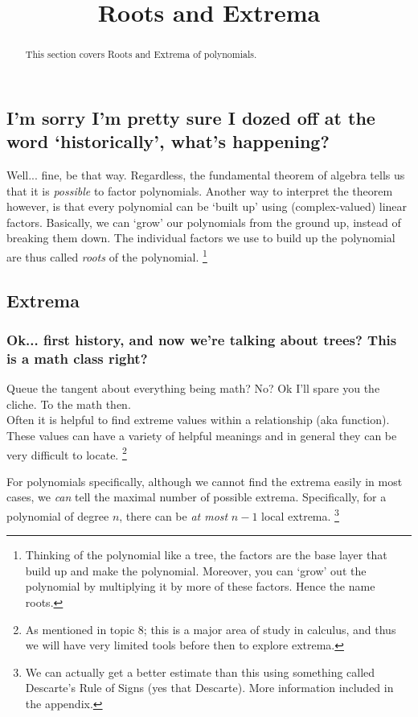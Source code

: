 \documentclass{ximeraXloud}
\title{Roots and Extrema}
\begin{document}
\begin{abstract}
This section covers Roots and Extrema of polynomials.
\end{abstract}
\maketitle

\subsection*{I'm sorry I'm pretty sure I dozed off at the word `historically', what's happening?}

    Well... fine, be that way. Regardless, the fundamental theorem of algebra tells us that it is \textit{possible} to factor polynomials. Another way to interpret the theorem however, is that every polynomial can be `built up' using (complex-valued) linear factors. Basically, we can `grow' our polynomials from the ground up, instead of breaking them down. The individual factors we use to build up the polynomial are thus called \textit{roots} of the polynomial.%
    \footnote{Thinking of the polynomial like a tree, the factors are the base layer that build up and make the polynomial. Moreover, you can `grow' out the polynomial by multiplying it by more of these factors. Hence the name roots.}


\subsection*{Extrema}
    \subsubsection*{Ok... first history, and now we're talking about trees? This is a math class right?}
        Queue the tangent about everything being math? No? Ok I'll spare you the cliche. To the math then.\\
        Often it is helpful to find extreme values within a relationship (aka function). These values can have a variety of helpful meanings and in general they can be very difficult to locate.%
        \footnote{As mentioned in topic 8; this is a major area of study in calculus, and thus we will have very limited tools before then to explore extrema.}
        
        For polynomials specifically, although we cannot find the extrema easily in most cases, we \textit{can} tell the maximal number of possible extrema. Specifically, for a polynomial of degree $n$, there can be \textit{at most} $n-1$ local extrema.%
        \footnote{We can actually get a better estimate than this using something called Descarte's Rule of Signs (yes that Descarte). More information included in the appendix.}
            
\end{document}
